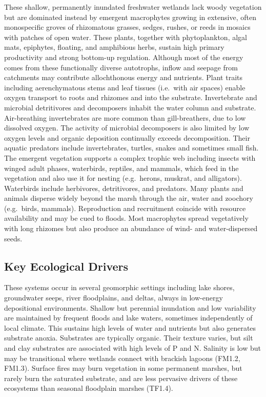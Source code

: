 \documentclass[
  letterpaper,
  DIV=11,
  numbers=noendperiod]{scrartcl}
\begin{document}
These shallow, permanently inundated freshwater wetlands lack woody
vegetation but are dominated instead by emergent macrophytes growing in
extensive, often monospecific groves of rhizomatous grasses, sedges,
rushes, or reeds in mosaics with patches of open water. These plants,
together with phytoplankton, algal mats, epiphytes, floating, and
amphibious herbs, sustain high primary productivity and strong bottom-up
regulation. Although most of the energy comes from these functionally
diverse autotrophs, inflow and seepage from catchments may contribute
allochthonous energy and nutrients. Plant traits including
aerenchymatous stems and leaf tissues (i.e.~with air spaces) enable
oxygen transport to roots and rhizomes and into the substrate.
Invertebrate and microbial detritivores and decomposers inhabit the
water column and substrate. Air-breathing invertebrates are more common
than gill-breathers, due to low dissolved oxygen. The activity of
microbial decomposers is also limited by low oxygen levels and organic
deposition continually exceeds decomposition. Their aquatic predators
include invertebrates, turtles, snakes and sometimes small fish. The
emergent vegetation supports a complex trophic web including insects
with winged adult phases, waterbirds, reptiles, and mammals, which feed
in the vegetation and also use it for nesting (e.g.~herons, muskrat, and
alligators). Waterbirds include herbivores, detritivores, and predators.
Many plants and animals disperse widely beyond the marsh through the
air, water and zoochory (e.g.~birds, mammals). Reproduction and
recruitment coincide with resource availability and may be cued to
floods. Most macrophytes spread vegetatively with long rhizomes but also
produce an abundance of wind- and water-dispersed seeds.

\subsection{Key Ecological Drivers}\label{key-ecological-drivers-105}

These systems occur in several geomorphic settings including lake
shores, groundwater seeps, river floodplains, and deltas, always in
low-energy depositional environments. Shallow but perennial inundation
and low variability are maintained by frequent floods and lake waters,
sometimes independently of local climate. This sustains high levels of
water and nutrients but also generates substrate anoxia. Substrates are
typically organic. Their texture varies, but silt and clay substrates
are associated with high levels of P and N. Salinity is low but may be
transitional where wetlands connect with brackish lagoons (FM1.2,
FM1.3). Surface fires may burn vegetation in some permanent marshes, but
rarely burn the saturated substrate, and are less pervasive drivers of
these ecosystems than seasonal floodplain marshes (TF1.4).
\end{document}
